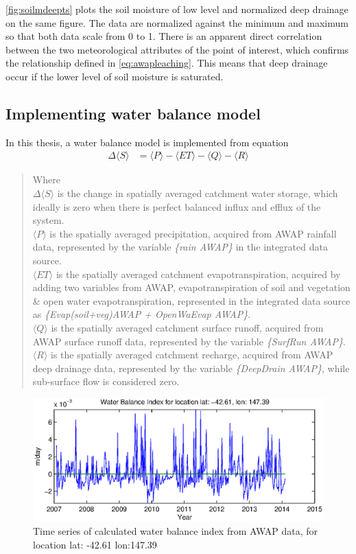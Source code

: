 \autoref{fig:soilmdeepts} plots the soil moisture of low level and normalized deep drainage on the same figure. The data are normalized against the minimum and maximum so that both data scale from 0 to 1. There is an apparent direct correlation between the two meteorological attributes of the point of interest, which confirms the relationship defined in \autoref{eq:awapleaching}. This means that deep drainage occur if the lower level of soil moisture is saturated.
\subsection{Implementing water balance model}
In this thesis, a water balance model is implemented from equation 
\begin{align}
	\Delta \langle S\rangle &= \langle P\rangle - \langle ET\rangle-\langle Q\rangle-\langle R\rangle
	\label{eq:wbsimple}
\end{align}
\begin{quote}Where \\
\indent$\Delta \langle S\rangle$ is the change in spatially averaged catchment water storage, which ideally is zero when there is perfect balanced influx and efflux of the system.\\
\indent$\langle P\rangle$ is the spatially averaged precipitation, acquired from AWAP rainfall data, represented by the variable \emph{\{rain AWAP\}} in the integrated data source.\\
\indent$\langle ET\rangle$ is the spatially averaged catchment evapotranspiration, acquired by adding two variables from AWAP, evapotranspiration of soil and vegetation \& open water evapotranspiration, represented in the integrated data source as \emph{\{Evap(soil+veg)AWAP + OpenWaEvap AWAP\}}.\\
\indent$\langle Q\rangle$ is the spatially averaged catchment surface runoff, acquired from AWAP surface runoff data, represented by the variable \emph{\{SurfRun AWAP\}}.\\
\indent$\langle R\rangle$ is the spatially averaged catchment recharge, acquired from AWAP deep drainage data, represented by the variable \emph{\{DeepDrain AWAP\}}, while sub-surface flow is considered zero.
\end{quote}
\begin{figure}[hbt]
\begin{center}
\includegraphics[width=\linewidth]{gfx/waterts.eps}
\end{center}
\caption{Time series of calculated water balance index from AWAP data, for location lat: -42.61 lon:147.39}
\label{fig:waterts}
\end{figure}
